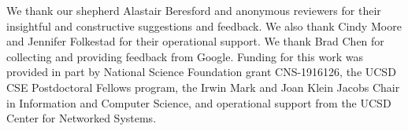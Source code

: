 \documentclass[sigconf,balance=false]{acmart}
\newcommand{\grant}[1]{\textsf{\textcolor{teal}{[GH: #1]}}}
\newcommand{\grant}[1]{}
\begin{document}






\begin{acks}
We thank our shepherd Alastair Beresford and anonymous reviewers for their insightful and
constructive suggestions and feedback. We also thank Cindy Moore and Jennifer Folkestad for
their operational support. We thank Brad Chen for collecting and providing feedback from Google. 
Funding for this work was provided in part by National Science
Foundation grant CNS-1916126,
the UCSD CSE
Postdoctoral Fellows program, the Irwin Mark and Joan Klein Jacobs
Chair in Information and Computer Science,
and operational support from the UCSD Center for Networked Systems.

\end{acks}
\end{document}
